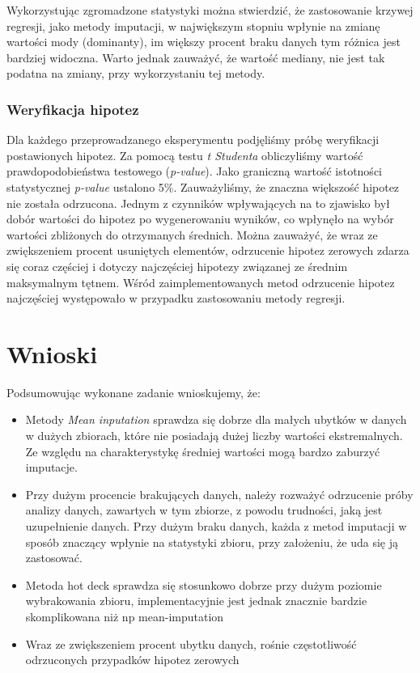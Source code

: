 \documentclass{classrep}
\begin{document}
{{            Wykorzystując zgromadzone statystyki można stwierdzić, że zastosowanie
            krzywej regresji, jako metody imputacji, w największym stopniu wpłynie na
            zmianę wartości mody (dominanty), im większy procent braku danych tym
            różnica jest bardziej widoczna. Warto jednak zauważyć, że wartość mediany,
            nie jest tak podatna na zmiany, przy wykorzystaniu tej metody.
        }

        \subsubsection{Weryfikacja hipotez}
        \label{summary:hypothesis} {
            Dla każdego przeprowadzanego eksperymentu podjęliśmy próbę weryfikacji
            postawionych hipotez. Za pomocą testu \textit{t Studenta} obliczyliśmy
            wartość prawdopodobieństwa testowego (\textit{p-value}). Jako graniczną
            wartość istotności statystycznej \textit{p-value} ustalono 5\%.
            Zauważyliśmy, że znaczna większość hipotez nie została odrzucona. Jednym z
            czynników wpływających na to zjawisko był dobór wartości do hipotez po
            wygenerowaniu wyników, co wpłynęło na wybór wartości zbliżonych do
            otrzymanych średnich. Można zauważyć, że wraz ze zwiększeniem procent
            usuniętych elementów, odrzucenie hipotez zerowych zdarza się coraz częściej
            i dotyczy najczęściej hipotezy związanej ze średnim maksymalnym tętnem.
            Wśród zaimplementowanych metod odrzucenie hipotez najczęściej występowało w
            przypadku zastosowaniu metody regresji.
        }
    }

    \section{Wnioski}
    \label{conclusions} {
        Podsumowując wykonane zadanie wnioskujemy, że:
        \begin{itemize}
            \item Metody \textit{Mean inputation} sprawdza się dobrze dla małych ubytków
            w danych w dużych zbiorach, które nie posiadają dużej liczby wartości
            ekstremalnych. Ze względu na charakterystykę średniej wartości mogą bardzo
            zaburzyć imputacje.
            \item Przy dużym procencie brakujących danych, należy rozważyć odrzucenie
            próby analizy danych, zawartych w tym zbiorze, z powodu trudności,
            jaką jest uzupełnienie danych. Przy dużym braku danych, każda z metod
            imputacji w sposób znaczący wpłynie na statystyki zbioru, przy
            założeniu, że uda się ją zastosować.
            \item Metoda hot deck sprawdza się stosunkowo dobrze przy dużym poziomie
            wybrakowania zbioru, implementacyjnie jest jednak znacznie
            bardzie skomplikowana niż np mean-imputation
            \item Wraz ze zwiększeniem procent ubytku danych, rośnie częstotliwość
            odrzuconych przypadków hipotez zerowych
        \end{itemize}
    }

    \begin{thebibliography}{0}
    \end{thebibliography}
\end{document}
